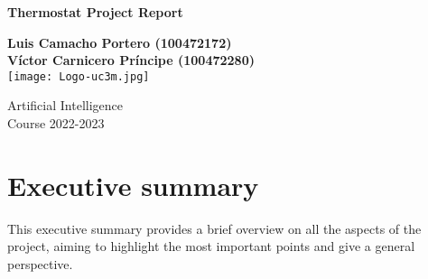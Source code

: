 \documentclass[12pt]{article}
\author{Luis Camacho}
\date{\today}
\title{}
\begin{document}
\setlength\parindent{0pt}
\begin{titlepage}

	\begin{center}
		\vspace*{80pt}

		\begin{LARGE}			\bf{Thermostat Project Report \\}
		\end{LARGE}
		\vspace{20pt}
		\textbf{
			Luis Camacho Portero (100472172)\\
			Víctor Carnicero Príncipe (100472280)}\\
		\vspace{40pt}
		\texttt{[image: Logo-uc3m.jpg]} \\
		\vspace{40pt}

\begin{Large}
		Artificial Intelligence\\
		\vspace{10pt}
		Course 2022-2023\\
\end{Large}
		\vspace{30pt}
		\vspace{30pt}


		\vspace{20pt}


	\end{center}
\end{titlepage}
\newpage
\thispagestyle{empty}
\tableofcontents
{}
\setcounter{page}{1}
\newpage
\section{Executive summary}
\label{sec:orgefc255d}
This executive summary provides a brief overview on all the aspects of the project, aiming to highlight the most important points and give a general perspective.\bigskip
\end{document}
